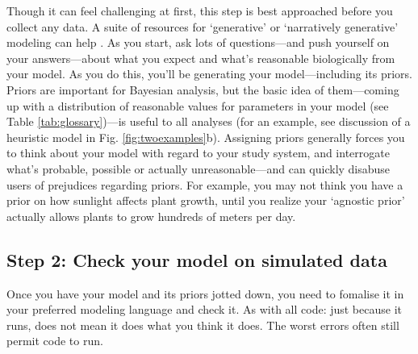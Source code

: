 \documentclass[11pt]{article}
\newcommand{\R}[1]{\label{}\linelabel{#1}}
\begin{document}
Though it can feel challenging at first, this step is best approached before you collect any data. A suite of resources for `generative' or `narratively generative' modeling can help \citep{statrethink,betangen}. %
As you start, ask lots of questions---and push yourself on your answers---about what you expect and what's reasonable biologically from your model. %
As you do this, you'll be generating your model---including its priors. Priors are important for Bayesian analysis, but the basic idea of them---coming up with a distribution of reasonable values for parameters in your model (see Table \ref{tab:glossary})---is useful to all analyses (for an example, see discussion of a heuristic model in Fig.  \ref{fig:twoexamples}b).\R{beyondMCMC4} Assigning priors generally forces you to think about your model with regard to your study system, and interrogate what's probable, possible or actually unreasonable---and can quickly disabuse users of prejudices regarding priors. For example, you may not think you have a prior on how sunlight affects plant growth, until you realize your `agnostic prior' actually allows plants to grow hundreds of meters per day. %

\subsection*{Step 2: Check your model on simulated data} 

Once you have your model and its priors jotted down, you need to fomalise it in your preferred modeling language and check it. As with all code: just because it runs, does not mean it does what you think it does. The worst errors often still permit code to run. %
\end{document}
